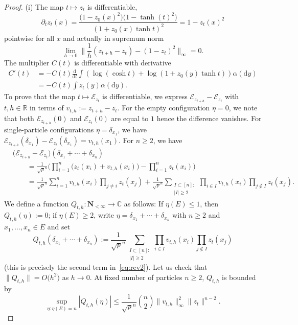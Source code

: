 \documentclass[pdftex]{sigma}
\numberwithin{equation}{section}
\newcommand{\R}{\mathbb{R}}
\newcommand{\C}{\mathbb{C}}
\newcommand{\dd}{\mathrm{d}} %
\newcommand{\1}{\mathbbm{1}}
\begin{document}
\begin{proof}
(i) The map $t\mapsto z_t$ is differentiable,
\[
	\partial_t z_t(x) = \frac{\bigl(1-z_0(x)^2\bigr) \bigl(1- \tanh(t)^2\bigr)}{(1+z_0(x)\tanh t)^2} = 1- z_t(x)^2
\]
pointwise for all $x$ and actually in supremum norm
\[
	\lim_{h\to 0} \biggl\| \frac{1}{h} (z_{t+h} - z_t) - (1- z_t)^2 \biggr\|_\infty =0.
\]
The multiplier $C(t)$ is differentiable with derivative
\begin{align}
	C'(t) &= - C(t) \frac{\dd}{\dd t}\int ( \log (\cosh t) + \log (1+z_0(y)\tanh t)) \alpha (\dd y) \nonumber\\
	 &= - C(t) \int z_t(y) \alpha(\dd y).\label{eq:ctdiff}
\end{align}
To prove that the map $t\mapsto \mathcal E_{z_t}$ is differentiable, we express $\mathcal E_{z_{t+h}} - \mathcal E_{z_t}$ with $t,h\in \R$ in terms of $v_{t,h}:= z_{t+h} - z_t$. For the empty configuration $\eta=0$, we note that both $\mathcal E_{z_{t+h}}(0)$ and $\mathcal E_{z_t}(0)$ are equal to $1$ hence the difference vanishes. For single-particle configurations $\eta=\delta_{x_1}$, we have $\mathcal E_{z_{t+h}} (\delta_{x_1}) - \mathcal E_{z_{t}} (\delta_{x_1}) = v_{t,h}(x_1)$.
For $n\geq 2$, we have
\begin{align}
	&\bigl(\mathcal E_{z_{t+h}} - \mathcal E_{z_t}\bigr) (\delta_{x_1}+\cdots+\delta_{x_n}) \nonumber\\
	&	\qquad {} = \frac{1}{{\sqrt p}^n} \Biggl( \prod_{i=1}^n \bigl(z_t(x_i)+ v_{t,h}(x_i)\bigr) - \prod_{i=1}^n z_t(x_i)\Biggr) \nonumber \\
	& \qquad {} = \frac{1}{{\sqrt p}^n} \sum_{i=1}^n v_{t,h}(x_i) \prod_{j \neq i} z_t(x_j) + \frac{1}{{\sqrt p}^n} \sum_{\substack{I\subset [n]:\\ |I|\geq 2}} \prod_{i\in I} v_{t,h}(x_i) \prod_{j\notin I} z_t(x_j). \label{eq:rev2}
\end{align}
We define a function $Q_{t,h}\colon \mathbf N_{<\infty}\to \C$ as follows: If $\eta(E)\leq 1$, then $Q_{t,h}(\eta):=0$; if $\eta(E) \geq 2$, write $\eta = \delta_{x_1}+\cdots+\delta_{x_n}$ with $n\geq 2$ and $x_1,\ldots,x_n\in E$ and set
\[
	Q_{t,h}(\delta_{x_1}+\cdots + \delta_{x_n}) := \frac{1}{{\sqrt p}^n} \sum_{\substack{I\subset [n]:\\ |I|\geq 2}} \prod_{i\in I} v_{t,h}(x_i) \prod_{j\notin I} z_t(x_j)
\]
(this is precisely the second term in~\eqref{eq:rev2}). Let us check that $\|Q_{t,h}\| = O\bigl(h^2\bigr)$ as $h\to 0$. At fixed number of particles $n\geq 2$, $Q_{t,h}$ is bounded by
\[
	\sup_{\eta\colon   \eta(E) = n} |Q_{t,h}(\eta)| \leq \frac{1}{{\sqrt p}^{n}} \binom{n}{2} \|v_{t,h}\|_\infty^2 \|z_t\|^{n-2}.
\]
\end{proof}
\end{document}
